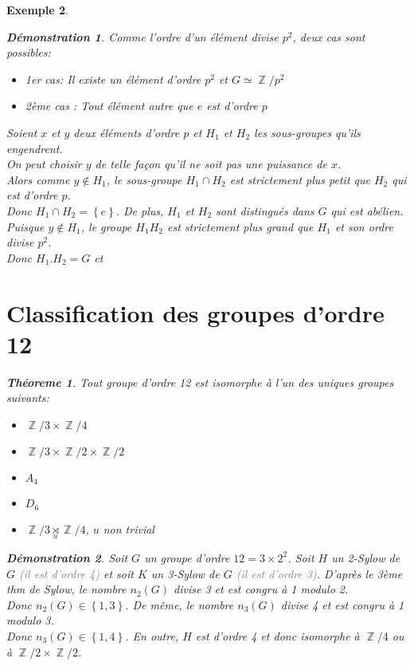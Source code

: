 \documentclass[a4paper, oneside]{report}
\theoremstyle{break}
\newtheorem{thm}{Théoreme}[section] %
\newtheorem{exemple}[thm]{Exemple}
\newtheorem*{demonstration}{Démonstration}
\newcommand{\gray}[1]{\textcolor{gray}{#1}}
\DeclareMathOperator{\Z}{\mathbb{Z}}
\DeclarePairedDelimiter\ens{\left\{ }{\right\} }%
\renewcommand{\ens}[1]{\left\{ #1 \right\} }%
\newcommand{\us}{\underset}
\begin{document}
\begin{exemple}
\begin{demonstration}
Comme l'ordre d'un élément divise $p^2$, deux cas sont possibles:
\begin{itemize}
\item 1er cas: Il existe un élément d'ordre $p^2$ et $G \simeq \Z/p^2$

\item 2ème cas : Tout élément autre que $e$ est d'ordre $p$
\end{itemize}
Soient $x$ et $y$ deux éléments d'ordre $p$ et $H_1$ et $H_2$ les sous-groupes qu'ils engendrent.\\
On peut choisir $y$ de telle façon qu'il ne soit pas une puissance de $x$.\\
Alors comme $y \notin H_1$, le sous-groupe $H_1 \cap H_2$ est strictement plus petit que $H_2$ qui est d'ordre $p$.\\
Donc $H_1 \cap H_2 = \ens{e}$. De plus, $H_1$ et $H_2$ sont distingués dans $G$ qui est abélien.\\
Puisque $y \notin H_1$, le groupe $H_1 H_2$ est strictement plus grand que $H_1$ et son ordre divise $p^2$.\\
Donc $H_1 . H_2 = G$ et 
\end{demonstration}

\section{Classification des groupes d'ordre 12}

\begin{thm}
Tout groupe d'ordre 12 est isomorphe à l'un des uniques groupes suivants:
\begin{itemize}[label=$\bullet$]
\item $\Z/3 \times \Z/4$

\item $\Z/3 \times \Z/2 \times \Z/2$

\item $A_4$

\item $D_6$

\item $\Z/3 \us{u}{\rtimes} \Z/4$, $u$ non trivial
\end{itemize}
\end{thm}

\begin{demonstration}
Soit $G$ un groupe d'ordre $12 = 3 \times 2^2$. Soit $H$ un 2-Sylow de $G$ \gray{(il est d'ordre 4)} et soit $K$ un 3-Sylow de $G$ \gray{(il est d'ordre 3)}. D'après le 3ème thm de Sylow, le nombre $n_2(G)$ divise 3 et est congru à 1 modulo 2.\\
Donc $n_2(G) \in \ens{1, 3}$. De même, le nombre $n_3(G)$ divise 4 et est congru à 1 modulo 3.\\
Donc $n_3(G) \in \ens{1, 4}$. En outre, $H$ est d'ordre 4 et donc isomorphe à $\Z/4$ ou à $\Z/2 \times \Z/2$.
\end{demonstration}


\end{exemple}
\end{document}
